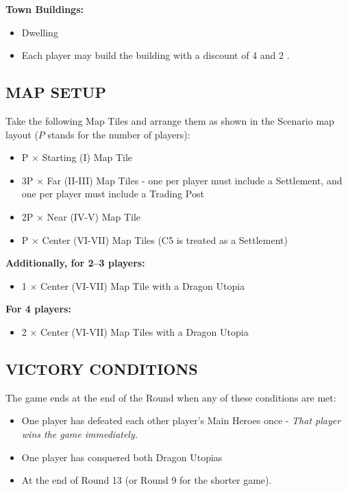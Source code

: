 \begin{multicols*}{2}
\textbf{Town Buildings:}
\begin{itemize}
  \item {} Dwelling
  \item Each player may build the  building with a discount of 4  and 2 . %
\end{itemize}

\subsection*{\MakeUppercase{Map Setup}}
Take the following Map Tiles and arrange them as shown in the Scenario map layout ($P$ stands for the number of players):

\begin{itemize}
  \item P × Starting (I) Map Tile
  \item 3P × Far (II-III) Map Tiles - one per player must include a Settlement, and one per player must include a Trading Post
  \item 2P × Near (IV-V) Map Tile
  \item P × Center (VI-VII) Map Tiles (C5 is treated as a Settlement)
\end{itemize}

\textbf{Additionally, for 2--3 players:}
\begin{itemize}
  \item 1 × Center (VI-VII) Map Tile with a Dragon Utopia
\end{itemize}

\textbf{For 4 players:}
\begin{itemize}
  \item 2 × Center (VI-VII) Map Tiles with a Dragon Utopia
\end{itemize}

\subsection*{\MakeUppercase{Victory Conditions}}
The game ends at the end of the Round when any of these conditions are met:

\begin{itemize}
 \item One player has defeated each other player's Main Heroes once - \textit{That player wins the game immediately.}
 \item One player has conquered both Dragon Utopias %
 \item At the end of Round 13 (or Round 9 for the shorter game).
\end{itemize}


\end{multicols*}
